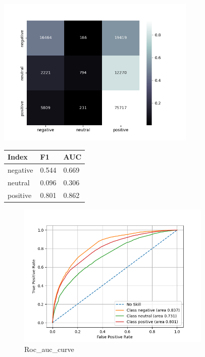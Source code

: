 \documentclass{article}%
\begin{document}
{\begin{minipage}[c]{0.95\textwidth}
\begin{minipage}{0.55\textwidth}
\end{minipage}%
\end{minipage}%
\linebreak%
\begin{minipage}{0.7\textwidth}%
\begin{minipage}{0.8\textwidth}%
\includegraphics[width=360px]{./report/Learning/Gradient_Boosting/confusion-matrix.png}%
\end{minipage}%
\begin{minipage}{0.5\textwidth}%
\begin{tabu}[t]{X[r] | X[r] X[r]}%
\hline%
\textbf{Index}&\textbf{F1}&\textbf{AUC}\\%
\hline%
negative&0.544&0.669\\%
neutral&0.096&0.306\\%
positive&0.801&0.862\\%
\end{tabu}%
\end{minipage}%
\end{minipage}%


\begin{figure}[h!]%
\centering%
\includegraphics[width=350px]{./report/Learning/Gradient_Boosting/True-Positive-Rate.png}%
\caption{Roc\_auc\_curve}%
\end{figure}

}
\end{document}
